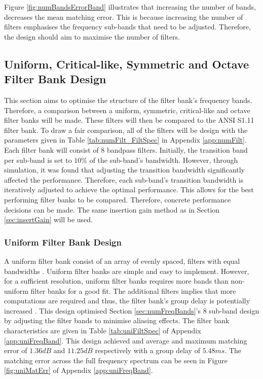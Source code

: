 \documentclass[11pt,onecolumn]{witseiepaper}
\begin{document}
\noindent Figure \ref{fig:numBandsErrorBand} illustrates that increasing the number of bands, decreases the mean matching error. This is because increasing the number of filters emphasises the frequency sub-bands that need to be adjusted. Therefore, the design should aim to maximise the number of filters.

\subsection{Uniform, Critical-like, Symmetric and Octave Filter Bank Design}
\label{sec:uniCritSymOct}

\noindent This section aims to optimise the structure of the filter bank's frequency bands. Therefore, a comparison between a uniform, symmetric, critical-like and octave filter banks will be made. These filters will then be compared to the ANSI S1.11 filter bank. To draw a fair comparison, all of the filters will be design with the parameters given in Table \ref{tab:numFilt_FiltSpec} in Appendix \ref{app:numFilt}. Each filter bank will consist of $8$ bandpass filters. Initially, the transition band per sub-band is set to $10\%$ of the sub-band's bandwidth. However, through simulation, it was found that adjusting the transition bandwidth significantly affected the performance. Therefore, each sub-band's transition bandwidth is iteratively adjusted to achieve the optimal performance. This allows for the best performing filter banks to be compared. Therefore, concrete performance decisions can be made. The same insertion gain method as in Section \ref{sec:insertGain} will be used.

\subsubsection{Uniform Filter Bank Design}
\label{sec:uniDesign}

\noindent A uniform filter bank consist of an array of evenly spaced, filters with equal bandwidths \cite{chang}. Uniform filter banks are simple and easy to implement. However, for a sufficient resolution, uniform filter banks requires more bands than non-uniform filter banks for a good fit. The additional filters implies that more computations are required and thus, the filter bank's group delay is potentially increased \cite{brennan}. This design optimised Section \ref{sec:numFreqBands}'s $8$ sub-band design by adjusting the filter bands to minimise aliasing effects. The filter bank characteristics are given in Table \ref{tab:uniFiltSpec} of Appendix \ref{app:uniFreqBand}. This design achieved and average and maximum matching error of $1.36dB$ and $11.25dB$ respectively with a group delay of $5.48ms$. The matching error across the full frequency spectrum can be seen in Figure \ref{fig:uniMatErr} of Appendix \ref{app:uniFreqBand}.
\end{document}
